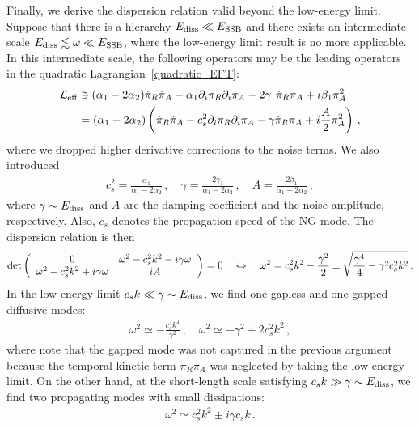\documentclass[a4paper,11pt]{article}
\begin{document}
\medskip
Finally, we derive the dispersion relation valid beyond the low-energy limit. Suppose that there is a hierarchy $E_{\rm diss}\ll E_{\rm SSB}$ and there exists an intermediate scale $E_{\rm diss}\lesssim \omega\ll E_{\rm SSB}$, where the low-energy limit result is no more applicable. In this intermediate scale, the following operators may be the leading operators in the quadratic Lagrangian~\eqref{quadratic_EFT}:
\begin{align}
\nonumber
\mathcal{L}_{\rm eff}&\ni
(\alpha_1-2\alpha_2)\dot{\pi}_R\dot{\pi}_A-\alpha_1\partial_i\pi_R\partial_i\pi_A
-2\gamma_1\dot{\pi}_R\pi_A+i\beta_1\pi_A^2
\\
&=
(\alpha_1-2\alpha_2)\left(
\dot{\pi}_R\dot{\pi}_A-c_s^2\partial_i\pi_R\partial_i\pi_A
-\gamma\dot{\pi}_R\pi_A+i\frac{A}{2}\pi_A^2
\right)
\,,
\label{eq:lag_eff_intscale}
\end{align}
where we dropped higher derivative corrections to the noise terms. We also introduced
\begin{align}
c_s^2=\frac{\alpha_1}{\alpha_1-2\alpha_2}\,,
\quad
\gamma=\frac{2\gamma_1}{\alpha_1-2\alpha_2}\,,
\quad
A=\frac{2\beta_1}{\alpha_1-2\alpha_2}\,,
\end{align}
where $\gamma\sim E_{\rm diss}$ and $A$ are the damping coefficient and the noise amplitude, respectively. 
Also, $c_s$ denotes the propagation speed of the NG mode.
The dispersion relation is then
\begin{align}
{\rm det}\left(
\begin{array}{cc}0 &\omega^2-c_s^2k^2- i\gamma\omega \\ \omega^2-c_s^2k^2+ i\gamma\omega & iA\end{array}
\right)=0
\quad
\Leftrightarrow
\quad
\omega^2=c_{s}^{2}k^2-\frac{\gamma^2}{2}\pm\sqrt{\frac{\gamma^4}{4}-\gamma^2c_{s}^{2}k^2}\,.
\end{align}
In the low-energy limit $c_{s}k\ll\gamma\sim E_{\rm diss}$, we find one gapless and one gapped diffusive modes:
\begin{align}
\omega^2\simeq- \frac{c_{s}^{4}k^4}{\gamma^2}\,,
\quad
\omega^2\simeq-  \gamma^2+2c_{s}^{2}k^2\,,
\end{align}
where note that the gapped mode was not captured in the previous argument because the temporal kinetic term $\dot{\pi}_R\dot{\pi}_A$ was neglected by taking the low-energy limit. 
On the other hand, at the short-length scale satisfying
$c_{s}k\gg \gamma\sim E_{\rm diss}$,  
we find two propagating modes with small dissipations:
\begin{align}
\omega^2\simeq c_{s}^{2}k^2\pm i \gamma c_{s}k\,.
\end{align}
\end{document}
